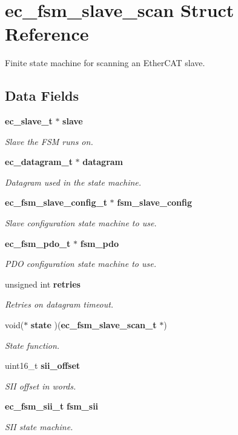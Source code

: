 \section{ec\-\_\-fsm\-\_\-slave\-\_\-scan Struct Reference}
\label{structec__fsm__slave__scan}


Finite state machine for scanning an Ether\-C\-A\-T slave.  


\subsection*{Data Fields}
\begin{DoxyCompactItemize}
\item 
{\bf ec\-\_\-slave\-\_\-t} $\ast$ {\bf slave}
\begin{DoxyCompactList}\small\item\em Slave the F\-S\-M runs on. \end{DoxyCompactList}\item 
{\bf ec\-\_\-datagram\-\_\-t} $\ast$ {\bf datagram}
\begin{DoxyCompactList}\small\item\em Datagram used in the state machine. \end{DoxyCompactList}\item 
{\bf ec\-\_\-fsm\-\_\-slave\-\_\-config\-\_\-t} $\ast$ {\bf fsm\-\_\-slave\-\_\-config}
\begin{DoxyCompactList}\small\item\em Slave configuration state machine to use. \end{DoxyCompactList}\item 
{\bf ec\-\_\-fsm\-\_\-pdo\-\_\-t} $\ast$ {\bf fsm\-\_\-pdo}
\begin{DoxyCompactList}\small\item\em P\-D\-O configuration state machine to use. \end{DoxyCompactList}\item 
unsigned int {\bf retries}
\begin{DoxyCompactList}\small\item\em Retries on datagram timeout. \end{DoxyCompactList}\item 
void($\ast$ {\bf state} )({\bf ec\-\_\-fsm\-\_\-slave\-\_\-scan\-\_\-t} $\ast$)
\begin{DoxyCompactList}\small\item\em State function. \end{DoxyCompactList}\item 
uint16\-\_\-t {\bf sii\-\_\-offset}
\begin{DoxyCompactList}\small\item\em S\-I\-I offset in words. \end{DoxyCompactList}\item 
{\bf ec\-\_\-fsm\-\_\-sii\-\_\-t} {\bf fsm\-\_\-sii}
\begin{DoxyCompactList}\small\item\em S\-I\-I state machine. \end{DoxyCompactList}\end{DoxyCompactItemize}



